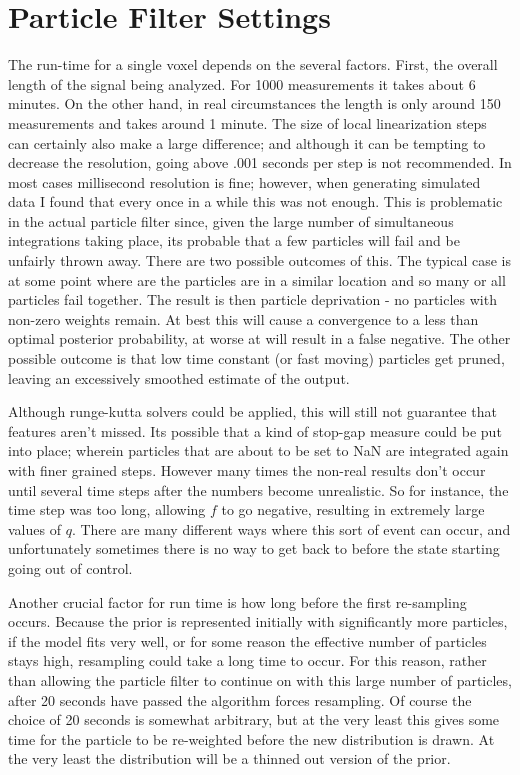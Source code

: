 \section{Particle Filter Settings}
The run-time for a single voxel depends on the several factors. First, the
overall length of the signal being analyzed. For 1000 measurements it takes
about 6 minutes. On the other hand, in real circumstances the
length is only around 150 measurements and takes around 1 minute. The size of 
local linearization steps can certainly also make a large difference; and 
although it can be tempting to decrease the resolution, going above .001 seconds
per step is not recommended. In most cases millisecond resolution
is fine; however, when generating simulated data I found that every once
in a while this was not enough. This is problematic in the actual particle
filter since, given the large number of simultaneous integrations taking 
place, its probable that a few particles will fail and be unfairly thrown away.
There are two possible outcomes of this. The typical case 
is at some point where are the particles are in a similar location and 
so many or all particles fail together.
The result is then particle deprivation - no particles with non-zero weights remain.
At best this will cause a convergence to a less than optimal posterior 
probability, at worse at will result in a false negative. 
The other possible outcome is that low time constant (or fast moving)
particles get pruned, leaving an excessively smoothed estimate of the output. 

Although runge-kutta solvers could be applied, this will still not
guarantee that features aren't missed. Its possible that a
kind of stop-gap measure could be put into place; wherein particles that are
about to be set to NaN are integrated again with finer grained steps. However
many times the non-real results don't occur until several time steps after the 
numbers become unrealistic. So for instance, the time step was too long, allowing 
$f$ to go negative, resulting in extremely large values of $q$. There are many
different ways where this sort of event can occur, and unfortunately sometimes
there is no way to get back to before the state starting going out of control.

Another crucial factor for run time is how long before the first re-sampling 
occurs. Because the prior is represented initially with significantly more
particles, if the model fits very well, or for some reason the effective
number of particles stays high, resampling could take a long time to occur.
For this reason, rather than allowing the particle filter to continue on 
with this large number of particles, after 20 seconds have passed the
algorithm forces resampling. Of course the choice of 20 seconds is somewhat
arbitrary, but at the very least this gives some time for the particle to
be re-weighted before the new distribution is drawn. At the very least the
distribution will be a thinned out version of the prior. 

